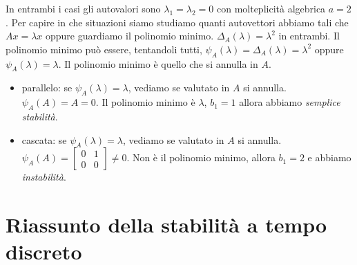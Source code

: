 In entrambi i casi gli autovalori sono $\lambda _1 =\lambda _2 =0$ con molteplicità algebrica $a=2$. Per capire in che situazioni siamo studiamo quanti autovettori abbiamo tali che $Ax=\lambda x$ oppure guardiamo il polinomio minimo. $\Delta _A\left(\lambda \right) =\lambda ^2$ in entrambi. Il polinomio minimo può essere, tentandoli tutti, $\psi _A\left(\lambda \right) =\Delta _A\left(\lambda \right) =\lambda ^2$ oppure $\psi _A\left(\lambda \right) =\lambda $. Il polinomio minimo è quello che si annulla in $A$.
\begin{itemize}
	\item parallelo: se $\psi _A\left(\lambda \right) =\lambda $, vediamo se valutato in $A$ si annulla. $\psi _A\left(A\right) =A=0$. Il polinomio minimo è $\lambda $, $b_1 =1$ allora abbiamo \textit{semplice stabilità}.
	\item cascata: se $\psi _A\left(\lambda \right) =\lambda $, vediamo se valutato in $A$ si annulla. $\psi _A\left(A\right) =\begin{bmatrix}
	      0 & 1\\
	      0 & 0
	\end{bmatrix} \neq 0$. Non è il polinomio minimo, allora $b_1 =2$ e abbiamo \textit{instabilità}.
\end{itemize}

\section{Riassunto della stabilità a tempo discreto}


